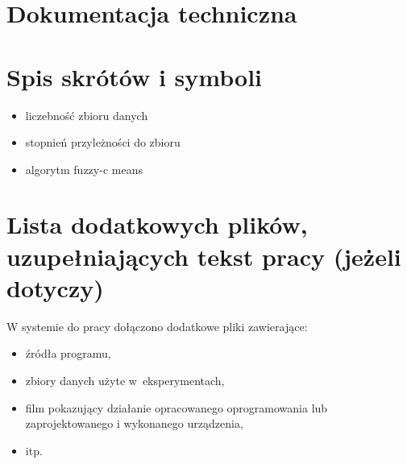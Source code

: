 \documentclass[a4paper,twoside,12pt]{book}
\begin{document}
\begin{appendices}

\chapter{Dokumentacja techniczna}


\chapter{Spis skrótów i symboli}

\begin{itemize}
\item[$N$] liczebność zbioru danych
\item[$\mu$] stopnień przyleżności do zbioru
\item[FCM] algorytm fuzzy-c means 
\end{itemize}

\chapter{Lista dodatkowych plików, uzupełniających tekst pracy (jeżeli dotyczy)} 

W systemie do pracy dołączono dodatkowe pliki zawierające:
\begin{itemize}
\item źródła programu,
\item zbiory danych użyte w~eksperymentach,
\item film pokazujący działanie opracowanego oprogramowania lub zaprojektowanego i wykonanego urządzenia,
\item itp.
\end{itemize}


\listoffigures
{}
\listoftables
{}

\end{appendices}
\end{document}
